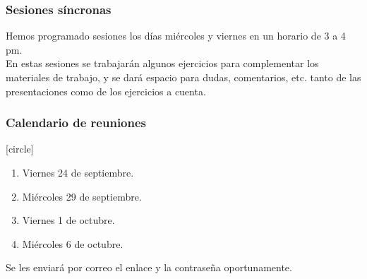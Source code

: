 \documentclass[12pt]{beamer}
\begin{document}
\begin{frame}
\frametitle{Sesiones síncronas}
Hemos programado sesiones los días miércoles y viernes en un horario de 3 a 4 pm.
\\
\bigskip
\pause
En estas sesiones se trabajarán algunos ejercicios para complementar los materiales de trabajo, y se dará espacio para dudas, comentarios, etc. tanto de las presentaciones como de los ejercicios a cuenta.
\end{frame}
\begin{frame}
\frametitle{Calendario de reuniones}
[circle]
\begin{enumerate}[<+->]
\item Viernes 24 de septiembre.
\item Miércoles 29 de septiembre.
\item Viernes 1 de octubre.
\item Miércoles 6 de octubre.
\end{enumerate}
\pause
Se les enviará por correo el enlace y la contraseña oportunamente.
\end{frame}
\end{document}
